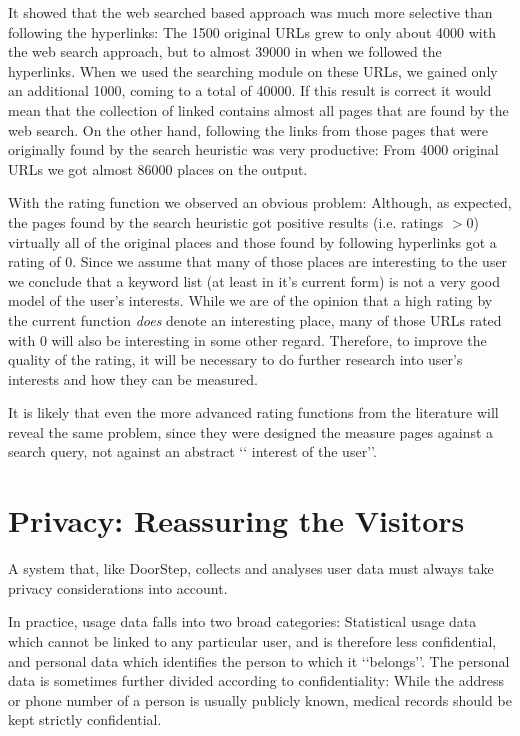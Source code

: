 \documentclass[a4paper]{danarticle}
\theoremstyle{remark}
\begin{document}
      It showed that the web searched based approach was much more selective
      than following the hyperlinks: The 1500 original URLs grew to only about 
      4000
      with the web search approach, but to almost 39000 in when we followed the
      hyperlinks. When we used the searching module on these URLs, we gained
      only an additional 1000, coming to a total of 40000. If this result is
      correct it would mean that the collection of linked contains almost all
      pages that are found by the web search. On the other hand, following the
      links from those pages that were originally found by the search heuristic
      was very productive: From 4000 original URLs we got almost 86000 places on
      the output.
      
      With the rating function we observed an obvious problem: Although, as
      expected, the pages found by the search heuristic got positive results
      (i.e. ratings $ > 0 $) virtually all of the original places and those
      found by following hyperlinks got a rating of 0. Since we assume that many
      of those places are interesting to the user we conclude that a keyword
      list (at least in it's current form) is not a very good model of the
      user's interests. While we are of the opinion that a high rating by the
      current function \emph{does} denote an interesting place, many of those
      URLs rated with 0 will also be interesting in some other regard.
      Therefore, to improve the quality of the rating, it will be necessary to
      do further research into user's interests and how they can be measured.
      
      It is likely that even the more advanced rating functions from the
      literature will reveal the same problem, since they were designed the
      measure pages against a search query, not against an abstract \lq\lq
      interest of the user\rq\rq .
  \section{Privacy: Reassuring the Visitors}
    A system that, like DoorStep, collects and analyses user data must always 
    take privacy considerations into account. 
    
    In practice, usage data falls into two broad categories: Statistical usage 
    data which cannot be linked to any particular user, and is therefore less 
    confidential, and personal data which identifies the 
    person to which it \lq\lq belongs\rq\rq . The personal data is 
    sometimes further divided according to confidentiality: While the address or 
    phone number of a person is usually publicly known, medical records should 
    be kept strictly confidential. 
    
\end{document}
